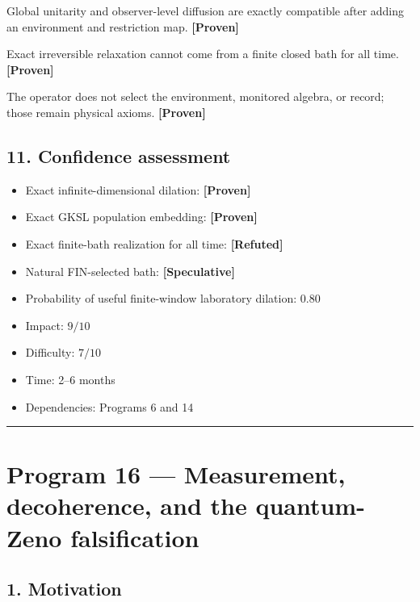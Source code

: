 \documentclass[11pt,a4paper,openany]{report}
\newcommand{\statusProven}{\textcolor{fingreen}{[Proven]}}
\newcommand{\statusSpeculative}{\textcolor{finorange}{[Speculative]}}
\newcommand{\statusRefuted}{\textcolor{finred}{[Refuted]}}
\begin{document}
Global unitarity and observer-level diffusion are exactly compatible after adding an environment and restriction map. \textbf{\statusProven{}}

Exact irreversible relaxation cannot come from a finite closed bath for all time. \textbf{\statusProven{}}

The operator does not select the environment, monitored algebra, or record; those remain physical axioms. \textbf{\statusProven{}}

\section{11. Confidence assessment}

\begin{itemize}
\item 
Exact infinite-dimensional dilation: \textbf{\statusProven{}}

\item 
Exact GKSL population embedding: \textbf{\statusProven{}}

\item 
Exact finite-bath realization for all time: \textbf{\statusRefuted{}}

\item 
Natural FIN-selected bath: \textbf{\statusSpeculative{}}

\item 
Probability of useful finite-window laboratory dilation: \(0.80\)

\item 
Impact: \(9/10\)

\item 
Difficulty: \(7/10\)

\item 
Time: 2–6 months

\item 
Dependencies: Programs 6 and 14

\end{itemize}

\par\medskip\hrule\medskip

\chapter{Program 16 — Measurement, decoherence, and the quantum-Zeno falsification}

\section{1. Motivation}
\end{document}
